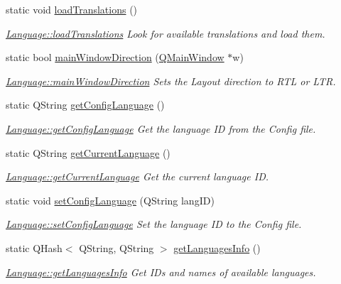 \begin{DoxyCompactItemize}
\item 
static void \hyperlink{class_language_aeebc39360aef6d5fd053fd60b6ddc99a}{load\+Translations} ()
\begin{DoxyCompactList}\small\item\em \hyperlink{class_language_aeebc39360aef6d5fd053fd60b6ddc99a}{Language\+::load\+Translations} Look for available translations and load them. \end{DoxyCompactList}\item 
static bool \hyperlink{class_language_a41e794bd617d77954179da57c2093412}{main\+Window\+Direction} (\hyperlink{class_q_main_window}{Q\+Main\+Window} $\ast$w)
\begin{DoxyCompactList}\small\item\em \hyperlink{class_language_a41e794bd617d77954179da57c2093412}{Language\+::main\+Window\+Direction} Sets the Layout direction to R\+TL or L\+TR. \end{DoxyCompactList}\item 
static Q\+String \hyperlink{class_language_a166c93720b89d805481cd70f6fe333a2}{get\+Config\+Language} ()
\begin{DoxyCompactList}\small\item\em \hyperlink{class_language_a166c93720b89d805481cd70f6fe333a2}{Language\+::get\+Config\+Language} Get the language ID from the Config file. \end{DoxyCompactList}\item 
static Q\+String \hyperlink{class_language_a8b7392bc644966ab95e5e18f3ef01c68}{get\+Current\+Language} ()
\begin{DoxyCompactList}\small\item\em \hyperlink{class_language_a8b7392bc644966ab95e5e18f3ef01c68}{Language\+::get\+Current\+Language} Get the current language ID. \end{DoxyCompactList}\item 
static void \hyperlink{class_language_a95f2608b1e56df6a792b24120a800399}{set\+Config\+Language} (Q\+String lang\+ID)
\begin{DoxyCompactList}\small\item\em \hyperlink{class_language_a95f2608b1e56df6a792b24120a800399}{Language\+::set\+Config\+Language} Set the language ID to the Config file. \end{DoxyCompactList}\item 
static Q\+Hash$<$ Q\+String, Q\+String $>$ \hyperlink{class_language_ac56915d59897ed05717af793b5aae7fb}{get\+Languages\+Info} ()
\begin{DoxyCompactList}\small\item\em \hyperlink{class_language_ac56915d59897ed05717af793b5aae7fb}{Language\+::get\+Languages\+Info} Get ID\textquotesingle{}s and names of available languages. \end{DoxyCompactList}\end{DoxyCompactItemize}


